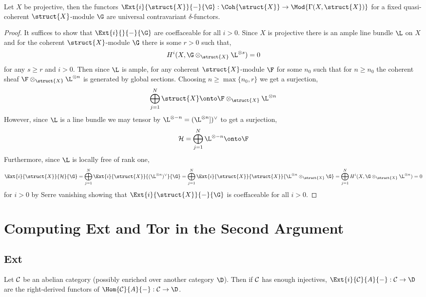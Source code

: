 \documentclass[12pt]{article}
\begin{document}
\begin{theorem}
Let $X$ be projective, then the functors $\Ext{i}{\struct{X}}{-}{\G} : \Coh{\struct{X}} \to \Mod{\Gamma(X, \struct{X})}$ for a fixed quasi-coherent $\struct{X}$-module $\G$ are universal contravariant $\delta$-functors. 
\end{theorem}

\begin{proof}
It suffices to show that $\Ext{i}{}{-}{\G}$ are coeffaceable for all $i > 0$. Since $X$ is projective there is an ample line bundle $\L$ on $X$ and for the coherent $\struct{X}$-module $\G$ there is some $r > 0$ such that,
\[ H^i(X, \G \otimes_{\struct{X}} \L^{\otimes s}) = 0 \]
for any $s \ge r$ and $i > 0$. Then since $\L$ is ample, for any coherent $\struct{X}$-module $\F$ for some $n_0$ such that for $n \ge n_0$ the coherent sheaf $\F \otimes_{\struct{X}} \L^{\otimes n}$ is generated by global sections. Choosing $n \ge \max \{ n_0, r \}$ we get a surjection,
\[ \bigoplus_{j = 1}^N \struct{X} \onto \F \otimes_{\struct{X}} \L^{\otimes n} \]
However, since $\L$ is a line bundle we may tensor by $\L^{\otimes -n} = (\L^{\otimes n}])^\vee  $ to get a surjection,
\[ \H = \bigoplus_{j = 1}^N \L^{\otimes -n} \onto \F \]
Furthermore, since $\L$ is locally free of rank one,
\[ \Ext{i}{\struct{X}}{\H}{\G} = \bigoplus_{j = 1}^N \Ext{i}{\struct{X}}{(\L^{\otimes n})^\vee}{\G} = \bigoplus_{j = 1}^N \Ext{i}{\struct{X}}{\struct{X}}{\L^{\otimes n} \otimes_{\struct{X}} \G} = \bigoplus_{j = 1}^N H^i(X,  \G \otimes_{\struct{X}} \L^{\otimes n}) = 0 \]
for $i > 0$ by Serre vanishing showing that $\Ext{i}{\struct{X}}{-}{\G}$ is coeffaceable for all $i > 0$.  
\end{proof}

\section{Computing Ext and Tor in the Second Argument}

\subsection{Ext}

\begin{definition}
Let $\mathcal{C}$ be an abelian category (possibly enriched over another category $\D$). Then if $\mathcal{C}$ has enough injectives, $\Ext{i}{\C}{A}{-} : \C \to \D$ are the right-derived functors of $\Hom{\C}{A}{-} : \C \to \D$. 
\end{definition}
\end{document}
